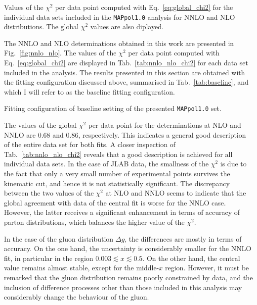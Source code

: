 \begin{table}[t!]
  \centering %
  \small
  
  \caption{
    \small
    Values of the $\chi^2$ per data point computed with Eq.~\eqref{eq:global_chi2} for the individual data sets included in the \texttt{MAPpol1.0} analysis for NNLO and NLO distributions. The global $\chi^2$ values are also diplayed.  
  \label{tab:nnlo_nlo_chi2}}%
\end{table}
%
The NNLO and NLO determinations obtained in this work are presented in Fig.~\ref{fig:nnlo_nlo}. The values of the $\chi^2$ per data point computed with Eq.~\eqref{eq:global_chi2} are displayed in Tab.~\ref{tab:nnlo_nlo_chi2} for each data set included in the analysis. The results presented in this section are obtained with the fitting configuration discussed above, summarised in Tab.~\ref{tab:baseline}, and which I will refer to as the baseline fitting configuration.%

\begin{table}[t!]
  \centering 
  \small
  
  \caption{
    \small
    Fitting configuration of baseline setting of the presented \texttt{MAPpol1.0} set.
  \label{tab:baseline}}
\end{table}

The values of the global $\chi^2$ per data point for the determinations at NLO and NNLO are $0.68$ and $0.86$, respectively. This indicates a general good description of the entire data set for both fits. A closer inspection of Tab.~\ref{tab:nnlo_nlo_chi2} reveals that a good description is achieved for all individual data sets. In the case of JLAB data, the smallness of the $\chi^2$ is due to the fact that only a very small number of experimental points survives the kinematic cut, and hence it is not statistically significant. The discrepancy between the two values of the $\chi^2$ at NLO and NNLO seems to indicate that the global agreement with data of the central fit is worse for the NNLO case. However, the latter receives a significant enhancement in terms of accuracy of parton distributions, which balances the higher value of the $\chi^2$.%

In the case of the gluon distribution $\Delta g$, the differences are mostly in terms of accuracy. On the one hand, the uncertainty is considerably smaller for the NNLO fit, in particular in the region $0.003 \lesssim x \lesssim 0.5$. On the other hand, the central value remains almost stable, except for the middle-$x$ region. However, it must be remarked that the gluon distribution remains poorly constrained by data, and the inclusion of difference processes other than those included in this analysis may considerably change the behaviour of the gluon.%

